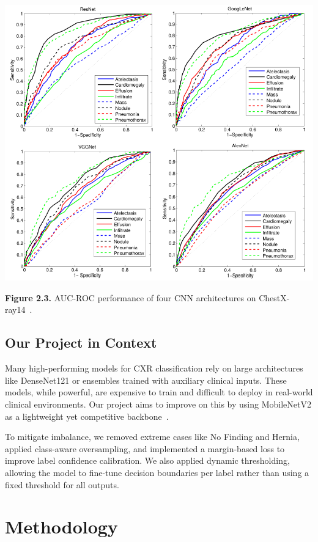\documentclass[12pt]{article}
\begin{document}
\begin{multicols}{2}
\begin{center}
    \includegraphics[width=\linewidth]{figure2.3.png}
    
    \textbf{Figure 2.3.} AUC-ROC performance of four CNN architectures on ChestX-ray14~\cite{wang2017chestx}.
\end{center}

\subsection{Our Project in Context}

Many high-performing models for CXR classification rely on large architectures like DenseNet121 or ensembles trained with auxiliary clinical inputs. These models, while powerful, are expensive to train and difficult to deploy in real-world clinical environments. Our project aims to improve on this by using MobileNetV2 as a lightweight yet competitive backbone~\cite{sandler2018mobilenetv2}.

To mitigate imbalance, we removed extreme cases like No Finding and Hernia, applied class-aware oversampling, and implemented a margin-based loss to improve label confidence calibration. We also applied dynamic thresholding, allowing the model to fine-tune decision boundaries per label rather than using a fixed threshold for all outputs.

\section{Methodology} \label{sec:method}


\end{multicols}
\end{document}
